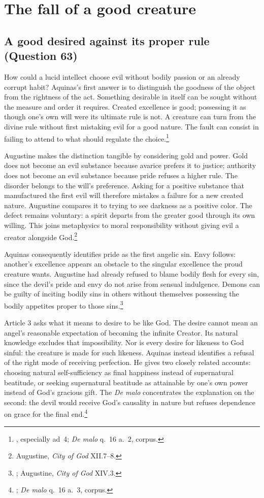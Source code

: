\section{The fall of a good creature}
\label{sec:angel-fall}

\subsection{A good desired against its proper rule (Question 63)}

How could a lucid intellect choose evil without bodily passion or an already corrupt habit? Aquinas's first answer is to distinguish the goodness of the object from the rightness of the act. Something desirable in itself can be sought without the measure and order it requires. Created excellence is good; possessing it as though one's own will were its ultimate rule is not. A creature can turn from the divine rule without first mistaking evil for a good nature. The fault can consist in failing to attend to what should regulate the choice.\footnote{, especially ad~4; \emph{De malo} q.~16 a.~2, corpus.}

Augustine makes the distinction tangible by considering gold and power. Gold does not become an evil substance because avarice prefers it to justice; authority does not become an evil substance because pride refuses a higher rule. The disorder belongs to the will's preference. Asking for a positive substance that manufactured the first evil will therefore mistakes a failure for a new created nature. Augustine compares it to trying to see darkness as a positive color. The defect remains voluntary: a spirit departs from the greater good through its own willing. This joins metaphysics to moral responsibility without giving evil a creator alongside God.\footnote{Augustine, \emph{City of God} XII.7--8.}

Aquinas consequently identifies pride as the first angelic sin. Envy follows: another's excellence appears an obstacle to the singular excellence the proud creature wants. Augustine had already refused to blame bodily flesh for every sin, since the devil's pride and envy do not arise from sensual indulgence. Demons can be guilty of inciting bodily sins in others without themselves possessing the bodily appetites proper to those sins.\footnote{; Augustine, \emph{City of God} XIV.3.}

Article 3 asks what it means to desire to be like God. The desire cannot mean an angel's reasonable expectation of becoming the infinite Creator. Its natural knowledge excludes that impossibility. Nor is every desire for likeness to God sinful: the creature is made for such likeness. Aquinas instead identifies a refusal of the right mode of receiving perfection. He gives two closely related accounts: choosing natural self-sufficiency as final happiness instead of supernatural beatitude, or seeking supernatural beatitude as attainable by one's own power instead of God's gracious gift. The \emph{De malo} concentrates the explanation on the second: the devil would receive God's causality in nature but refuses dependence on grace for the final end.\footnote{; \emph{De malo} q.~16 a.~3, corpus.}

